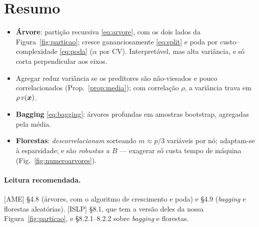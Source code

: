 \documentclass[11pt,a4paper]{article}
\begin{document}
\section*{Resumo}
\begin{itemize}[leftmargin=1.4cm]
  \item \textbf{Árvore}: partição recursiva \eqref{eq:arvore}, com os dois lados da
        Figura~\ref{fig:particao}; cresce gananciosamente \eqref{eq:split} e poda por
        custo--complexidade \eqref{eq:poda} ($\alpha$ por CV). Interpretável, mas
        alta variância, e só corta perpendicular aos eixos.
  \item Agregar reduz variância se os preditores são não-viesados e pouco
        correlacionados (Prop.~\ref{prop:media}); com correlação $\rho$, a variância
        trava em $\rho\,v(\bm{x})$.
  \item \textbf{Bagging} \eqref{eq:bagging}: árvores profundas em amostras
        bootstrap, agregadas pela média.
  \item \textbf{Florestas}: \emph{descorrelacionam} sorteando $m\approx p/3$
        variáveis por nó; adaptam-se à esparsidade; e são \emph{robustas a $B$} ---
        exagerar só custa tempo de máquina (Fig.~\ref{fig:numeroarvores}).
\end{itemize}

\paragraph{Leitura recomendada.} [AME] §4.8 (árvores, com o algoritmo de
crescimento e poda) e §4.9 (\emph{bagging} e florestas aleatórias). [ISLP] §8.1,
que tem a versão deles da nossa Figura~\ref{fig:particao}, e §8.2.1--8.2.2 sobre
\emph{bagging} e florestas.
\end{document}
